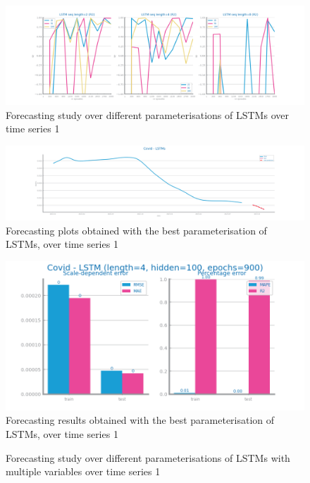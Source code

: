 \documentclass[10pt]{extarticle}
\begin{document}
\begin{figure}[H]
\centering\includegraphics[scale=0.4]{images/dataset1/time_series/Covid_lstm_study_R2.png}
\caption{Forecasting study over different parameterisations of LSTMs over time series 1}
\end{figure}

\begin{figure}[H]
\centering\includegraphics[scale=0.4]{images/dataset1/time_series/Covid - LSTMs _forecasting_series.png}
\caption{Forecasting plots obtained with the best parameterisation of LSTMs, over time series 1}
\end{figure}

\begin{figure}[H]
\centering\includegraphics[scale=0.5]{images/dataset1/time_series/Covid - LSTM (length=4, hidden=100, epochs=900)_forecasting_eval.png}
\caption{Forecasting results obtained with the best parameterisation of LSTMs, over time series 1}
\end{figure}

\begin{figure}[H]
\caption{Forecasting study over different parameterisations of LSTMs with multiple variables over time series 1}
\end{figure}
\end{document}
